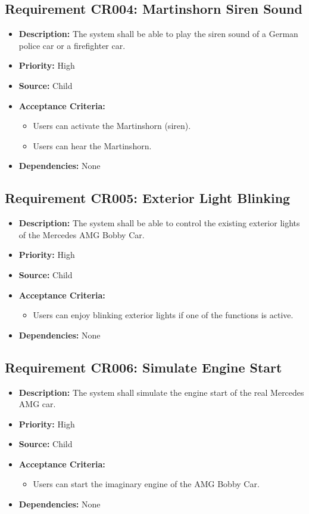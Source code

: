 \documentclass{article}
\begin{document}
	\subsection{Requirement CR004: Martinshorn Siren Sound}
	\begin{itemize}
		\item \textbf{Description:} The system shall be able to play the siren sound of a German police car or a firefighter car.
		\item \textbf{Priority:} High
		\item \textbf{Source:} Child
		\item \textbf{Acceptance Criteria:}
		\begin{itemize}
			\item Users can activate the Martinshorn (siren).
			\item Users can hear the Martinshorn.
		\end{itemize}
		\item \textbf{Dependencies:} None
	\end{itemize}
	
	\subsection{Requirement CR005: Exterior Light Blinking}
	\begin{itemize}
		\item \textbf{Description:} The system shall be able to control the existing exterior lights of the Mercedes AMG Bobby Car.
		\item \textbf{Priority:} High
		\item \textbf{Source:} Child
		\item \textbf{Acceptance Criteria:}
		\begin{itemize}
			\item Users can enjoy blinking exterior lights if one of the functions is active.
		\end{itemize}
		\item \textbf{Dependencies:} None
	\end{itemize}
	
	\subsection{Requirement CR006: Simulate Engine Start}
	\begin{itemize}
		\item \textbf{Description:} The system shall simulate the engine start of the real Mercedes AMG car.
		\item \textbf{Priority:} High
		\item \textbf{Source:} Child
		\item \textbf{Acceptance Criteria:}
		\begin{itemize}
			\item Users can start the imaginary engine of the AMG Bobby Car.
		\end{itemize}
		\item \textbf{Dependencies:} None
	\end{itemize}
	
\end{document}
